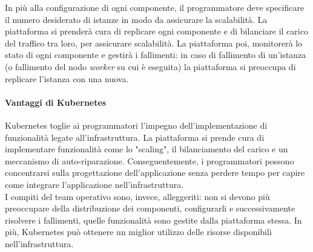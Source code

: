 \documentclass{article}
\begin{document}
In più alla configurazione di ogni componente, il programmatore deve specificare il numero desiderato di istanze in modo da assicurare la scalabilità. La piattaforma si prenderà cura di replicare ogni componente e di bilanciare il carico del traffico tra loro, per assicurare scalabilità. La piattaforma poi, monitorerà lo stato di ogni componente e gestirà i fallimenti: in caso di fallimento di un'istanza (o fallimento del nodo \textit{worker} su cui è eseguita) la piattaforma si preoccupa di replicare l'istanza con una nuova.
\paragraph{Vantaggi di Kubernetes}
Kubernetes toglie ai programmatori l'impegno dell'implementazione di funzionalità legate all'infrastruttura. La piattaforma si prende cura di implementare funzionalità come lo "scaling", il bilanciamento del carico e un meccanismo di auto-riparazione. Conseguentemente, i programmatori possono concentrarsi sulla progettazione dell'applicazione senza perdere tempo per capire come integrare l'applicazione nell'infrastruttura. \\
I compiti del team operativo sono, invece, alleggeriti: non si devono più preoccupare della distribuzione dei componenti, configurarli e successivamente risolvere i fallimenti, quelle funzionalità sono gestite dalla piattaforma stessa. In più, Kubernetes può ottenere un miglior utilizzo delle risorse disponibili nell'infrastruttura. 
\end{document}
